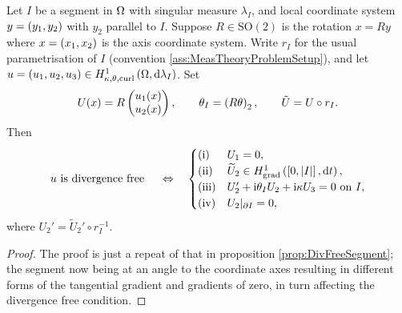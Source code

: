 \begin{cory} \label{cory:DivFreeRotated}
	Let $I$ be a segment in $\Omega$ with singular measure $\lambda_I$, and local coordinate system $y=\left( y_1, y_2 \right)$ with $y_2$ parallel to $I$.
	Suppose $R\in\mathrm{SO}(2)$ is the rotation $x=Ry$ where $x=\left( x_1, x_2 \right)$ is the axis coordinate system.
	Write $r_I$ for the usual parametrisation of $I$ (convention \ref{ass:MeasTheoryProblemSetup}), and let $u=\left( u_1,u_2,u_3 \right)\in H^1_{\kappa,\theta,\mathrm{curl}}\left( \Omega, \mathrm{d}\lambda_I \right)$.
	Set
	\begin{align*}
		U(x) = R \begin{pmatrix} u_1(x) \\ u_2(x) \end{pmatrix}, 
		\qquad \theta_I = \left(  R\theta  \right)_2,
		\qquad \tilde{U} = U \circ r_I.
	\end{align*}
	Then
	\begin{align*}
		u \text{ is divergence free } \quad\Leftrightarrow\quad
		\begin{cases}
			\mathrm{(i)} & U_1 = 0, \\
			\mathrm{(ii)} & \widetilde{U}_2 \in H^1_\mathrm{grad}\left( \left[ 0,\left\lvert I \right\rvert \right], \mathrm{d}t \right), \\
			\mathrm{(iii)} & U_2' + \mathrm{i}\theta_I U_2 + \mathrm{i}\kappa U_3 = 0 \text{ on } I, \\
			\mathrm{(iv)} & U_2\vert_{\partial I} = 0,
		\end{cases}
	\end{align*}
	where $U_2' = \widetilde{U}_2'\circ r_I^{-1}$.
\end{cory}
\begin{proof}
	The proof is just a repeat of that in proposition \ref{prop:DivFreeSegment}; the segment now being at an angle to the coordinate axes resulting in different forms of the tangential gradient and gradients of zero, in turn affecting the divergence free condition.
\end{proof}

